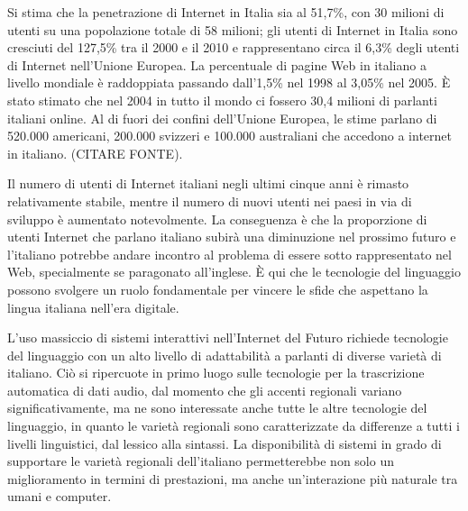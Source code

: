 \documentclass[]{../../metanetpaper}
\begin{document}
\begin{multicols}{2}
Si stima che la penetrazione di Internet in Italia sia al 51,7\%, con 30
milioni di utenti su una popolazione totale di 58 milioni; gli utenti di
Internet in Italia sono cresciuti del 127,5\% tra il 2000 e il 2010 e
rappresentano circa il 6,3\% degli utenti di Internet nell'Unione Europea. La
percentuale di pagine Web in italiano a livello mondiale \`{e} raddoppiata
passando dall'1,5\% nel 1998 al 3,05\% nel 2005. \`{E} stato stimato che nel
2004 in tutto il mondo ci fossero 30,4 milioni di parlanti italiani online. Al
di fuori dei confini dell'Unione Europea, le stime parlano di 520.000
americani, 200.000 svizzeri e 100.000 australiani che accedono a internet in
italiano. (CITARE FONTE).


Il numero di utenti di Internet italiani negli ultimi cinque anni \`{e}
rimasto relativamente stabile, mentre il numero di nuovi utenti nei paesi in
via di sviluppo \`{e} aumentato notevolmente. La conseguenza \`{e} che la
proporzione di utenti Internet che parlano italiano subir\`{a} una diminuzione
nel prossimo futuro e l'italiano potrebbe andare incontro al problema di
essere sotto rappresentato nel Web, specialmente se paragonato
all'inglese. \`{E} qui che le tecnologie del linguaggio possono svolgere un
ruolo fondamentale per vincere le sfide che aspettano la lingua italiana
nell'era digitale.





L'uso massiccio di sistemi interattivi nell'Internet del Futuro richiede
tecnologie del linguaggio con un alto livello di adattabilit\`{a} a parlanti
di diverse variet\`{a} di italiano. Ci\`{o} si ripercuote in primo luogo sulle
tecnologie per la trascrizione automatica di dati audio, dal momento che gli
accenti regionali variano significativamente, ma ne sono interessate anche
tutte le altre tecnologie del linguaggio, in quanto le variet\`{a} regionali
sono caratterizzate da differenze a tutti i livelli linguistici, dal lessico
alla sintassi. La disponibilit\`{a} di sistemi in grado di supportare le
variet\`{a} regionali dell'italiano permetterebbe non solo un miglioramento in
termini di prestazioni, ma anche un'interazione pi\`{u} naturale tra umani e
computer.



\end{multicols}
\end{document}
